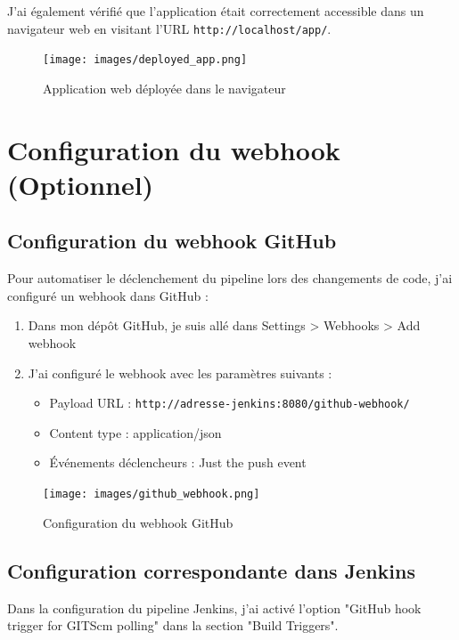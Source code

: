 \documentclass{article}
\begin{document}
J'ai également vérifié que l'application était correctement accessible dans un navigateur web en visitant l'URL \texttt{http://localhost/app/}.

\begin{figure}[h]
    \centering
    \texttt{[image: images/deployed\_app.png]}
    \caption{Application web déployée dans le navigateur}
    \label{fig:deployed_app}
\end{figure}

\section{Configuration du webhook (Optionnel)}
\subsection{Configuration du webhook GitHub}

Pour automatiser le déclenchement du pipeline lors des changements de code, j'ai configuré un webhook dans GitHub :

\begin{enumerate}
    \item Dans mon dépôt GitHub, je suis allé dans Settings > Webhooks > Add webhook
    \item J'ai configuré le webhook avec les paramètres suivants :
    \begin{itemize}
        \item Payload URL : \texttt{http://adresse-jenkins:8080/github-webhook/}
        \item Content type : application/json
        \item Événements déclencheurs : Just the push event
    \end{itemize}
\end{enumerate}

\begin{figure}[h]
    \centering
    \texttt{[image: images/github\_webhook.png]}
    \caption{Configuration du webhook GitHub}
    \label{fig:github_webhook}
\end{figure}

\subsection{Configuration correspondante dans Jenkins}

Dans la configuration du pipeline Jenkins, j'ai activé l'option "GitHub hook trigger for GITScm polling" dans la section "Build Triggers".
\end{document}
